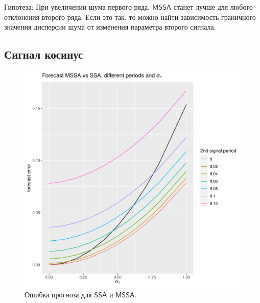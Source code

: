 \documentclass[specialist, substylefile = spbureport.rtx,
    subf,href,colorlinks=true, 12pt]{disser}
\newcommand{\SSA}{\mathsf{SSA}}
\newcommand{\MSSA}{\mathsf{MSSA}}
\begin{document}
        Гипотеза: При увеличении шума первого ряда, $\MSSA$ станет лучше для любого отклонения второго ряда. Если это так, то можно найти зависимость граничного значения дисперсии шума от изменения параметра второго сигнала.

    \subsection{Сигнал косинус}
        

        \begin{figure}
            \centering
            \begin{minipage}{.5\textwidth}
                \centering
                \includegraphics[width=\textwidth]{experiment_2_cos1.pdf}
                \caption{Ошибка прогноза для $\SSA$ и $\MSSA$.}
                \label{fig:exp2_cos1}
            \end{minipage}%
            \begin{minipage}{.5\textwidth}
                \centering

\end{minipage}
\end{figure}
\end{document}
